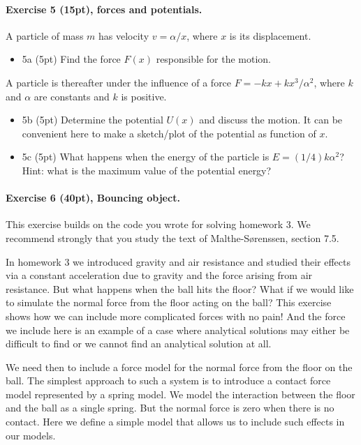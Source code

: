 \documentclass[%
oneside,                 %
final,                   %
10pt]{article}
\begin{document}
\noindent
\paragraph{Exercise 5 (15pt), forces  and potentials.}
A particle of mass $m$ has velocity $v=\alpha/x$, where $x$ is its displacement.

\begin{itemize}
\item 5a (5pt) Find the force $F(x)$ responsible for the motion.
\end{itemize}

\noindent
A particle is thereafter under the influence of a force $F=-kx+kx^3/\alpha^2$, where $k$ and $\alpha$ are constants and $k$ is positive.

\begin{itemize}
\item 5b (5pt) Determine the potential $U(x)$  and discuss the motion. It can be convenient here to make a sketch/plot of the potential as function of $x$.

\item 5c (5pt)  What happens when the energy of the particle is $E=(1/4)k\alpha^2$? Hint: what is the maximum value of the potential energy?
\end{itemize}

\noindent
\paragraph{Exercise 6 (40pt), Bouncing object.}
This exercise builds on the code you wrote for solving homework 3.
We recommend strongly that you study the text of Malthe-Sørenssen, section 7.5.

In homework 3 we introduced gravity and air resistance and studied their
effects via a constant acceleration due to gravity and the force
arising from air resistance. But what happens when the ball hits the
floor? What if we would like to simulate the normal force from the
floor acting on the ball?  This exercise shows how we can include more
complicated forces with no pain! And the force we include here is an
example of a case where analytical solutions may either be difficult
to find or we cannot find an analytical solution at all.

We need then to include a force model for the normal force from the
floor on the ball. The simplest approach to such a system is to
introduce a contact force model represented by a spring model.  We
model the interaction between the floor and the ball as a single
spring. But the normal force is zero when there is no contact. Here we
define a simple model that allows us to include such effects in our
models.
\end{document}
